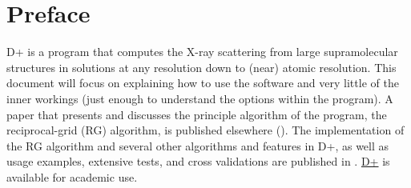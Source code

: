 \documentclass[../D+Manual.tex]{subfiles}
\begin{document}
\chapter{Preface}
\label{sec:preface}
\pagestyle{ruled}

D+ is a program that computes the X-ray scattering from large supramolecular structures in solutions at any resolution down to (near) atomic resolution.
This document will focus on explaining how to use the software and very little of the inner workings (just enough to understand the options within the program).
A paper that presents and discusses the principle algorithm of the program, the reciprocal-grid (RG) algorithm, is published elsewhere (\cite{RGs2016}). The implementation of the RG algorithm and several other algorithms and features in D+, as well as usage examples, extensive tests, and cross validations are published in \cite{Dplus2017}.   \href{https://scholars.huji.ac.il/uriraviv/software/d-software-high-resolution-hierarchical-modeling-solution-x-ray-scattering-complex}{D+} is available for academic use. 
\end{document}
